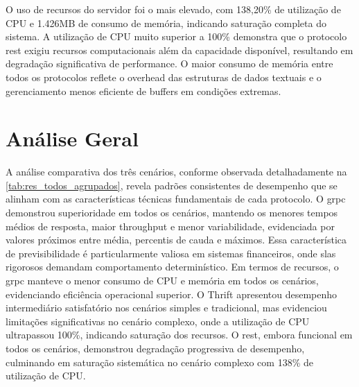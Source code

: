 O uso de recursos do servidor foi o mais elevado, com 138,20\% de utilização de CPU e 1.426MB de consumo de memória, indicando saturação completa do sistema. A utilização de CPU muito superior a 100\% demonstra que o protocolo \gls{rest} exigiu recursos computacionais além da capacidade disponível, resultando em degradação significativa de performance. O maior consumo de memória entre todos os protocolos reflete o overhead das estruturas de dados textuais e o gerenciamento menos eficiente de buffers em condições extremas.

\section{Análise Geral}

A análise comparativa dos três cenários, conforme observada detalhadamente na \autoref{tab:res_todos_agrupados}, revela padrões consistentes de desempenho que se alinham com as características técnicas fundamentais de cada protocolo. O \gls{grpc} demonstrou superioridade em todos os cenários, mantendo os menores tempos médios de resposta, maior throughput e menor variabilidade, evidenciada por valores próximos entre média, percentis de cauda e máximos. Essa característica de previsibilidade é particularmente valiosa em sistemas financeiros, onde \acrshort{sla}s rigorosos demandam comportamento determinístico. Em termos de recursos, o \gls{grpc} manteve o menor consumo de CPU e memória em todos os cenários, evidenciando eficiência operacional superior. O Thrift apresentou desempenho intermediário satisfatório nos cenários simples e tradicional, mas evidenciou limitações significativas no cenário complexo, onde a utilização de CPU ultrapassou 100\%, indicando saturação dos recursos. O \gls{rest}, embora funcional em todos os cenários, demonstrou degradação progressiva de desempenho, culminando em saturação sistemática no cenário complexo com 138\% de utilização de CPU.

